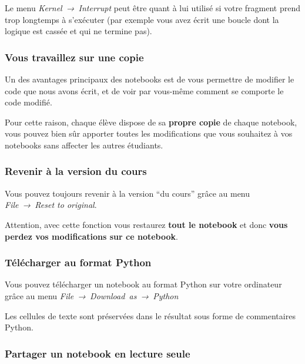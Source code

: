     Le menu \emph{Kernel~→~Interrupt} peut être quant à lui utilisé si votre
fragment prend trop longtemps à s'exécuter (par exemple vous avez écrit
une boucle dont la logique est cassée et qui ne termine pas).

    \hypertarget{vous-travaillez-sur-une-copie}{%
\subsubsection{Vous travaillez sur une
copie}\label{vous-travaillez-sur-une-copie}}

    Un des avantages principaux des notebooks est de vous permettre de
modifier le code que nous avons écrit, et de voir par vous-même comment
se comporte le code modifié.

Pour cette raison, chaque élève dispose de sa \textbf{propre copie} de
chaque notebook, vous pouvez bien sûr apporter toutes les modifications
que vous souhaitez à vos notebooks sans affecter les autres étudiants.

    \hypertarget{revenir-uxe0-la-version-du-cours}{%
\subsubsection{Revenir à la version du
cours}\label{revenir-uxe0-la-version-du-cours}}

    Vous pouvez toujours revenir à la version ``du cours'' grâce au menu
\emph{File~→~Reset to original}.

    Attention, avec cette fonction vous restaurez \textbf{tout le notebook}
et donc \textbf{vous perdez vos modifications sur ce notebook}.

    \hypertarget{tuxe9luxe9charger-au-format-python}{%
\subsubsection{Télécharger au format
Python}\label{tuxe9luxe9charger-au-format-python}}

    Vous pouvez télécharger un notebook au format Python sur votre
ordinateur grâce au menu \emph{File~→~Download~as~→~Python}

    Les cellules de texte sont préservées dans le résultat sous forme de
commentaires Python.

    \hypertarget{partager-un-notebook-en-lecture-seule}{%
\subsubsection{Partager un notebook en lecture
seule}\label{partager-un-notebook-en-lecture-seule}}

